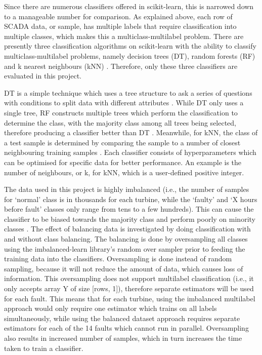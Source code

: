 Since there are numerous classifiers offered in scikit-learn, this is narrowed down to a manageable number for comparison. As explained above, each row of SCADA data, or sample, has multiple labels that require classification into multiple classes, which makes this a multiclass-multilabel problem. There are presently three classification algorithms on scikit-learn with the ability to classify multiclass-multilabel problems, namely decision trees (DT), random forests (RF) and k nearest neighbours (kNN) \cite{112}. Therefore, only these three classifiers are evaluated in this project.

DT is a simple technique which uses a tree structure to ask a series of questions with conditions to split data with different attributes \cite{Decis10}. While DT only uses a single tree, RF constructs multiple trees which perform the classification to determine the class, with the majority class among all trees being selected, therefore producing a classifier better than DT \cite{Rando}. Meanwhile, for kNN, the class of a test sample is determined by comparing the sample to a number of closest neighbouring training samples \cite{Sutto12,16N}. Each classifier consists of hyperparameters which can be optimised for specific data for better performance. An example is the number of neighbours, or k, for kNN, which is a user-defined positive integer.

The data used in this project is highly imbalanced (i.e., the number of samples for `normal' class is in thousands for each turbine, while the `faulty' and `X hours before fault' classes only range from tens to a few hundreds). This can cause the classifier to be biased towards the majority class and perform poorly on minority classes \cite{110}. The effect of balancing data is investigated by doing classification with and without class balancing. The balancing is done by oversampling all classes using the imbalanced-learn library's random over sampler \cite{Lemai} prior to feeding the training data into the classifiers. Oversampling is done instead of random sampling, because it will not reduce the amount of data, which causes loss of information. This oversampling does not support multilabel classification (i.e., it only accepts array Y of size [rows, 1]), therefore separate estimators will be used for each fault. This means that for each turbine, using the imbalanced multilabel approach would only require one estimator which trains on all labels simultaneously, while using the balanced dataset approach requires separate estimators for each of the 14 faults which cannot run in parallel. Oversampling also results in increased number of samples, which in turn increases the time taken to train a classifier.

